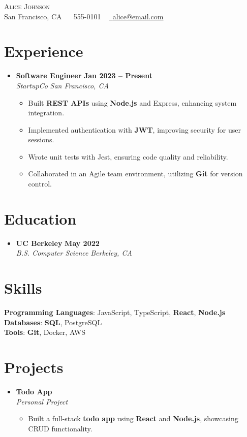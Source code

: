 \documentclass[a4paper,11pt]{article}
\newcommand{\resumeItem}[1]{
  \item\small{#1 \vspace{-0.5pt}}
}
\newcommand{\resumeSubheading}[4]{
  \vspace{-1pt}\item
  \textbf{#1} \hfill \textbf{\small #2} \\
  \textit{\small#3} \hfill \textit{\small #4} \\
  \vspace{-3pt}
}
\newcommand{\resumeSubHeadingListStart}{\begin{itemize}[leftmargin=0.0in, label={}]}
\newcommand{\resumeSubHeadingListEnd}{\end{itemize}}
\newcommand{\resumeItemListStart}{\begin{itemize}[itemsep=0pt]}
\newcommand{\resumeItemListEnd}{\end{itemize}\vspace{-2pt}}
\begin{document}
\begin{center}
    {\Huge \scshape Alice Johnson} \\ \vspace{1pt}
    \small San Francisco, CA ~ \raisebox{-0.1\height}\faPhone\ 555-0101 ~
    \href{mailto:alice@email.com}{\raisebox{-0.2\height}\faEnvelope\ \underline{alice@email.com}}
    \vspace{-5pt}
\end{center}

\section{Experience}
\resumeSubHeadingListStart
  \resumeSubheading{Software Engineer}{Jan 2023 -- Present}{StartupCo}{San Francisco, CA}
    \resumeItemListStart
      \resumeItem{Built \textbf{REST APIs} using \textbf{Node.js} and Express, enhancing system integration.}
      \resumeItem{Implemented authentication with \textbf{JWT}, improving security for user sessions.}
      \resumeItem{Wrote unit tests with Jest, ensuring code quality and reliability.}
      \resumeItem{Collaborated in an Agile team environment, utilizing \textbf{Git} for version control.}
    \resumeItemListEnd
\resumeSubHeadingListEnd

\section{Education}
\resumeSubHeadingListStart
  \resumeSubheading{UC Berkeley}{May 2022}{B.S. Computer Science}{Berkeley, CA}
\resumeSubHeadingListEnd

\section{Skills}
\resumeSubHeadingListStart
\small{\item{
  \textbf{Programming Languages}: JavaScript, TypeScript, \textbf{React}, \textbf{Node.js} \\
  \textbf{Databases}: \textbf{SQL}, PostgreSQL \\
  \textbf{Tools}: \textbf{Git}, Docker, AWS
}}
\resumeSubHeadingListEnd

\section{Projects}
\resumeSubHeadingListStart
  \resumeSubheading{Todo App}{}{Personal Project}{} 
    \resumeItemListStart
      \resumeItem{Built a full-stack \textbf{todo app} using \textbf{React} and \textbf{Node.js}, showcasing CRUD functionality.}
    \resumeItemListEnd
\resumeSubHeadingListEnd
\end{document}
